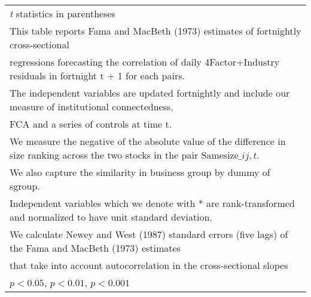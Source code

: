{\begin{tabular}{l*{8}{c}}
\hline\hline
\multicolumn{9}{l}{\footnotesize \textit{t} statistics in parentheses}\\
\multicolumn{9}{l}{\footnotesize This table reports Fama and MacBeth (1973) estimates of fortnightly cross-sectional}\\
\multicolumn{9}{l}{\footnotesize  regressions forecasting the correlation of daily 4Factor+Industry residuals in fortnight t + 1 for each pairs.}\\
\multicolumn{9}{l}{\footnotesize The independent variables are updated fortnightly and include our measure of institutional connectedness,}\\
\multicolumn{9}{l}{\footnotesize  FCA and a series of controls at time t.}\\
\multicolumn{9}{l}{\footnotesize We measure the negative of the absolute value of the difference in size ranking across the two stocks in the pair $ \text{Samesize}\_{ij,t} $.}\\
\multicolumn{9}{l}{\footnotesize We also capture the similarity in business group by dummy of sgroup.}\\
\multicolumn{9}{l}{\footnotesize Independent variables which  we denote with * are rank-transformed and normalized to have unit standard deviation.}\\
\multicolumn{9}{l}{\footnotesize  We calculate Newey and West (1987) standard errors (five lags) of the Fama and MacBeth (1973) estimates }\\
\multicolumn{9}{l}{\footnotesize  that take into account autocorrelation in the cross-sectional slopes}\\
\multicolumn{9}{l}{\footnotesize \sym{*} \(p<0.05\), \sym{**} \(p<0.01\), \sym{***} \(p<0.001\)}\\
\end{tabular}
}
